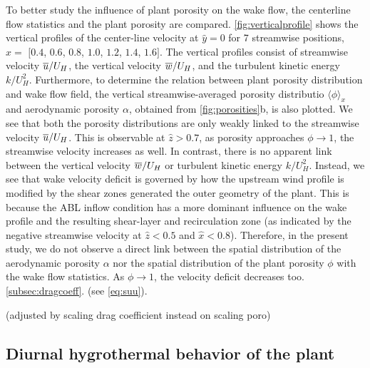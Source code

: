 To better study the influence of plant porosity on the wake flow, the centerline flow statistics and the plant porosity are compared. \cref{fig:verticalprofile} shows the vertical profiles of the center-line velocity at $\hat{y}=0$ for 7 streamwise positions, $\hat{x} =$ $[0.4$, $0.6$, $0.8$, $1.0$, $1.2$, $1.4$, $1.6]$. The vertical profiles consist of streamwise velocity $\overline{u}/U_H$, the vertical velocity $\overline{w}/U_H$, and the turbulent kinetic energy $k/U_H^2$. Furthermore, to determine the relation between plant porosity distribution and wake flow field, the vertical streamwise-averaged porosity distributio $\langle \phi \rangle_x$ and aerodynamic porosity $\alpha$, obtained from \cref{fig:porosities}b, is also plotted. We see that both the porosity distributions are only weakly linked to the streamwise velocity $\overline{u}/U_H$. This is observable at $\hat{z}>0.7$, as porosity approaches $\phi\rightarrow1$, the streamwise velocity increases as well. In contrast, there is no apparent link between the vertical velocity $\overline{w}/U_H$ or turbulent kinetic energy $k/U_H^2$. Instead, we see that wake velocity deficit is governed by how the upstream wind profile is modified by the shear zones generated the outer geometry of the plant. This is because the ABL inflow condition has a more dominant influence on the wake profile and the resulting shear-layer and recirculation zone (as indicated by the negative streamwise velocity at $\hat{z} <0.5$ and $\hat{x}<0.8$). Therefore, in the present study, we do not observe a direct link between the spatial distribution of the aerodynamic porosity $\alpha$ nor the spatial distribution of the plant porosity $\phi$ with the wake flow statistics.  As $\phi \rightarrow 1$, the velocity deficit decreases too.  \cref{subsec:dragcoeff}.  (see \cref{eq:suu}). 

 (adjusted by scaling drag coefficient instead on scaling poro)

\subsection{Diurnal hygrothermal behavior of the plant}
\label{subsec:diurnal}

